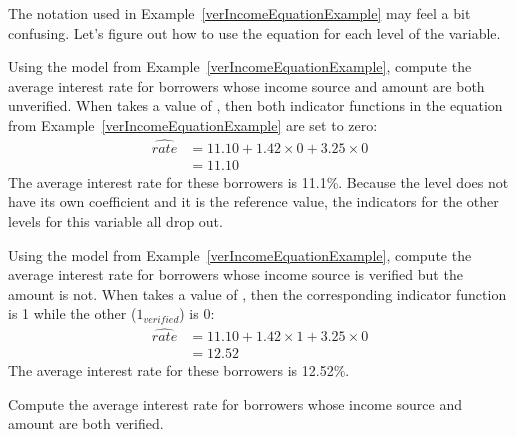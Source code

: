 The notation used in Example~\ref{verIncomeEquationExample}
may feel a bit confusing.
Let's figure out how to use the equation for each level
of the  variable.

\begin{examplewrap}
\begin{nexample}{Using the model from
    Example~\ref{verIncomeEquationExample},
    compute the average interest rate for borrowers
    whose income source and amount are both unverified.}
  When  takes a value of ,
  then both indicator functions in the equation from
  Example~\ref{verIncomeEquationExample}
  are set to zero:
  \begin{align*}
  \widehat{rate} &= 11.10 +
      1.42 \times 0 +
      3.25 \times 0 \\
    &= 11.10
  \end{align*}
  The average interest rate for these borrowers is 11.1\%.
  Because the  level does not have its own
  coefficient and it is the reference value,
  the indicators for the other levels for this variable
  all drop out.
\end{nexample}
\end{examplewrap}

\begin{examplewrap}
\begin{nexample}{Using the model from
    Example~\ref{verIncomeEquationExample},
    compute the average interest rate for borrowers
    whose income source is verified but the amount is not.}
  When  takes a value of
  ,
  then the corresponding indicator function is 1
  while the other ($1_{verified}$) is 0:
  \begin{align*}
  \widehat{rate} &= 11.10 +
      1.42 \times 1 +
      3.25 \times 0 \\
    &= 12.52
  \end{align*}
  The average interest rate for these borrowers is 12.52\%.
\end{nexample}
\end{examplewrap}

\begin{exercisewrap}
\begin{nexercise}
Compute the average interest rate for borrowers
whose income source and amount are both verified.\footnotemark
\end{nexercise}
\end{exercisewrap}

